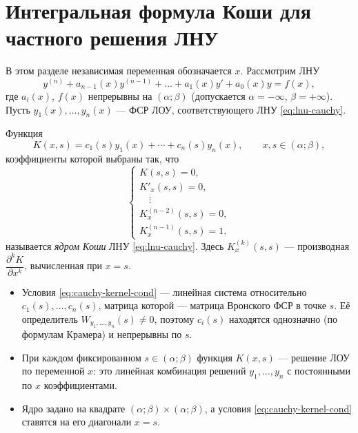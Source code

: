 \documentclass[12pt,a4paper]{article}
\numberwithin{equation}{section}
\DeclareRobustCommand{\examtag}[1]{\space{\normalfont\small\color{HSEgray}(#1)}}
\begin{document}
\section[Интегральная формула Коши\examtag{вопрос~22}]{Интегральная формула Коши для частного решения ЛНУ\examtag{вопрос~22}}
\label{sec:cauchy}

В этом разделе независимая переменная обозначается \(x\). Рассмотрим ЛНУ
\begin{equation}
y^{(n)}+a_{n-1}(x)y^{(n-1)}+\ldots+a_1(x)y'+a_0(x)y=f(x),
\label{eq:lnu-cauchy}
\end{equation}
где \(a_i(x)\), \(f(x)\) непрерывны на \((\alpha;\beta)\) (допускается \(\alpha=-\infty\), \(\beta=+\infty\)). Пусть \(y_1(x),\ldots,y_n(x)\) --- ФСР ЛОУ, соответствующего ЛНУ \eqref{eq:lnu-cauchy}.

\begin{definitionHSE}
Функция
\begin{equation}
K(x,s)=c_1(s)y_1(x)+\cdots+c_n(s)y_n(x),\qquad x,s\in(\alpha;\beta),
\label{eq:cauchy-kernel}
\end{equation}
коэффициенты которой выбраны так, что
\begin{equation}
\begin{cases}
K(s,s)=0,\\
K'_x(s,s)=0,\\
\quad\vdots\\
K^{(n-2)}_x(s,s)=0,\\
K^{(n-1)}_x(s,s)=1,
\end{cases}
\label{eq:cauchy-kernel-cond}
\end{equation}
называется \textit{ядром Коши} ЛНУ \eqref{eq:lnu-cauchy}. Здесь \(K^{(k)}_x(s,s)\) --- производная \(\dfrac{\partial^kK}{\partial x^k}\), вычисленная при \(x=s\).
\end{definitionHSE}

\begin{remarkHSE}
\begin{itemize}
\item Условия \eqref{eq:cauchy-kernel-cond} --- линейная система относительно \(c_1(s),\ldots,c_n(s)\), матрица которой --- матрица Вронского ФСР в точке \(s\). Её определитель \(W_{y_1,\ldots,y_n}(s)\neq0\), поэтому \(c_i(s)\) находятся однозначно (по формулам Крамера) и непрерывны по \(s\).
\item При каждом фиксированном \(s\in(\alpha;\beta)\) функция \(K(x,s)\) --- решение ЛОУ по переменной \(x\): это линейная комбинация решений \(y_1,\ldots,y_n\) с постоянными по \(x\) коэффициентами.
\item Ядро задано на квадрате \((\alpha;\beta)\times(\alpha;\beta)\), а условия \eqref{eq:cauchy-kernel-cond} ставятся на его диагонали \(x=s\).
\end{itemize}
\end{remarkHSE}
\end{document}
